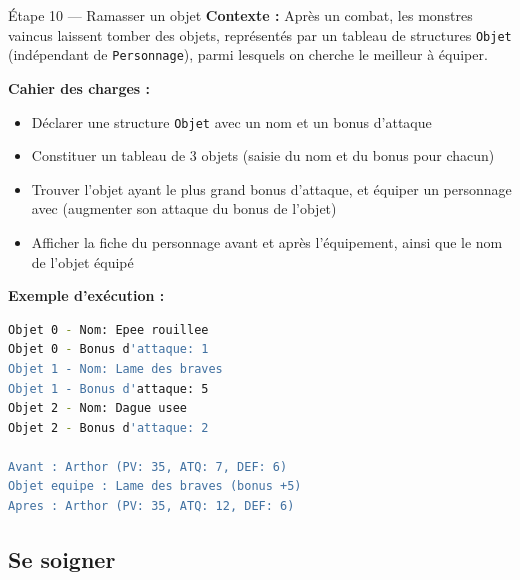 \begin{UPSTIManipulation}{Étape 10 — Ramasser un objet}
  \textbf{Contexte :} Après un combat, les monstres vaincus laissent tomber des objets,
  représentés par un tableau de structures \texttt{Objet} (indépendant de
  \texttt{Personnage}), parmi lesquels on cherche le meilleur à équiper.

  \textbf{Cahier des charges :}
  \begin{itemize}
    \item Déclarer une structure \texttt{Objet} avec un nom et un bonus d'attaque
    \item Constituer un tableau de 3 objets (saisie du nom et du bonus pour chacun)
    \item Trouver l'objet ayant le plus grand bonus d'attaque, et équiper un personnage avec
      (augmenter son attaque du bonus de l'objet)
    \item Afficher la fiche du personnage avant et après l'équipement, ainsi que le nom de
      l'objet équipé
  \end{itemize}

  \textbf{Exemple d'exécution :}
  \begin{lstlisting}[language=bash]
Objet 0 - Nom: Epee rouillee
Objet 0 - Bonus d'attaque: 1
Objet 1 - Nom: Lame des braves
Objet 1 - Bonus d'attaque: 5
Objet 2 - Nom: Dague usee
Objet 2 - Bonus d'attaque: 2

Avant : Arthor (PV: 35, ATQ: 7, DEF: 6)
Objet equipe : Lame des braves (bonus +5)
Apres : Arthor (PV: 35, ATQ: 12, DEF: 6)
  \end{lstlisting}

\end{UPSTIManipulation}

\subsection{Se soigner}

